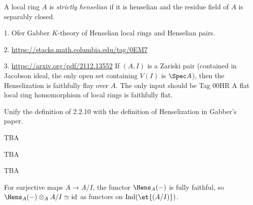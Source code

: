 \begin{definition}
    \label{def:strictly-henselian-local-ring}
    \leanok

    A local ring \(A\) is \emph{strictly henselian} if it is henselian and the residue field of \(A\) is separably closed.
\end{definition}

1. Ofer Gabber \(K\)-theory of Henselian local rings and Henselian pairs.

2. \url{https://stacks.math.columbia.edu/tag/0EM7}

3. \url{https://arxiv.org/pdf/2112.13552} If \((A,I)\) is a Zariski pair (contained in Jacobson ideal, the only open set containing \(V(I)\) is \(\Spec A\)), then the Henselization is faithfully flay over \(A\). The only input should be Tag 00HR A flat local ring homomorphism of local rings is faithfully flat.

Unify the definition of 2.2.10 with the definition of Henselization in Gabber's paper.

\begin{definition}
    \label{def:henselian-pair}

    TBA
\end{definition}

\begin{definition}
    \label{def:henselization}

    TBA

\end{definition}

\begin{theorem}
    \label{thm:henselization-is-henselian}
    TBA

\end{theorem}

\begin{lemma}
    \label{lem:henselization-fully-faithful}

    For surjective maps $A \to A/I$, the functor $\Hens_A(-)$ is fully faithful, so $\Hens_A(-) \otimes_A A/I \simeq \mathrm{id}$ as functors on $\mathrm{Ind}(\et{(A/I)})$.
\end{lemma}



